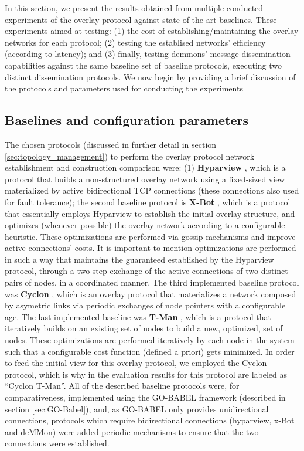 


In this section, we present the results obtained from multiple conducted experiments of the overlay protocol against state-of-the-art baselines. These experiments aimed at testing: (1) the cost of establishing/maintaining the overlay networks for each protocol; (2) testing the establised networks' efficiency (according to latency); and (3) finally, testing demmons' message dissemination capabilities against the same baseline set of baseline protocols, executing two distinct dissemination protocols. We now begin by providing a brief discussion of the protocols and parameters used for conducting the experiments

\subsection{Baselines and configuration parameters}

The chosen protocols (discussed in further detail in section \ref{sec:topology_management}) to perform the overlay protocol network establishment and construction comparison were: (1) \textbf{Hyparview} , which is a protocol that builds a non-structured overlay network using a fixed-sized view materialized by active bidirectional TCP connections (these connections also used for fault tolerance); the second baseline protocol is \textbf{X-Bot} , which is a protocol that essentially employs Hyparview to establish the initial overlay structure, and optimizes (whenever possible) the overlay network according to a configurable heuristic. These optimizations are performed via gossip mechanisms and improve active connections' costs. It is important to mention optimizations are performed in such a way that maintains the guaranteed established by the Hyparview protocol, through a two-step exchange of the active connections of two distinct pairs of nodes, in a coordinated manner. The third implemented baseline protocol was \textbf{Cyclon} , which is an overlay protocol that materializes a network composed by asymetric links via periodic exchanges of node pointers with a configurable age. The last implemented baseline was \textbf{T-Man} , which is a protocol that iteratively builds on an existing set of nodes to build a new, optimized, set of nodes. These optimizations are performed iteratively by each node in the system such that a configurable cost function  (defined a priori) gets minimized. In order to feed the initial view for this overlay protocol, we employed the Cyclon protocol, which is why in the evaluation results for this protocol are labeled as ``Cyclon T-Man''. All of the described baseline protocols were, for comparativeness, implemented using the GO-BABEL framework (described in section \ref{sec:GO-Babel}), and, as GO-BABEL only provides unidirectional connections, protocols which require bidirectional connections (hyparview, x-Bot and deMMon) were added periodic mechanisms to ensure that the two connections were established.


